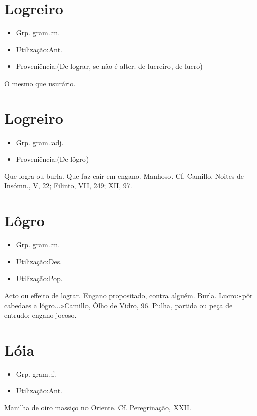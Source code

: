 \section{Logreiro}
\begin{itemize}
\item {Grp. gram.:m.}
\end{itemize}
\begin{itemize}
\item {Utilização:Ant.}
\end{itemize}
\begin{itemize}
\item {Proveniência:(De \textunderscore lograr\textunderscore , se não é alter. de \textunderscore lucreiro\textunderscore , de \textunderscore lucro\textunderscore )}
\end{itemize}
O mesmo que \textunderscore usurário\textunderscore .
\section{Logreiro}
\begin{itemize}
\item {Grp. gram.:adj.}
\end{itemize}
\begin{itemize}
\item {Proveniência:(De \textunderscore lôgro\textunderscore )}
\end{itemize}
Que logra ou burla.
Que faz caír em engano.
Manhoso. Cf. Camillo, \textunderscore Noites de Insómn.\textunderscore , V, 22; Filinto, VII, 249; XII, 97.
\section{Lôgro}
\begin{itemize}
\item {Grp. gram.:m.}
\end{itemize}
\begin{itemize}
\item {Utilização:Des.}
\end{itemize}
\begin{itemize}
\item {Utilização:Pop.}
\end{itemize}
Acto ou effeito de lograr.
Engano propositado, contra alguém.
Burla.
Lucro:«\textunderscore pôr cabedaes a lôgro...\textunderscore »Camillo, \textunderscore Ôlho de Vidro\textunderscore , 96.
Pulha, partida ou peça de entrudo; engano jocoso.
\section{Lóia}
\begin{itemize}
\item {Grp. gram.:f.}
\end{itemize}
\begin{itemize}
\item {Utilização:Ant.}
\end{itemize}
Manilha de oiro massiço no Oriente. Cf. \textunderscore Peregrinação\textunderscore , XXII.
